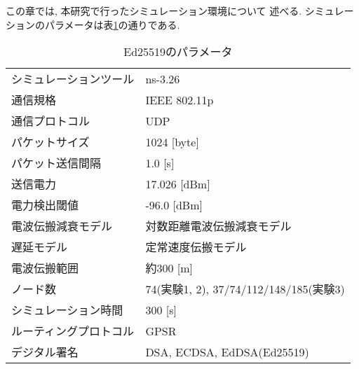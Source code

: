 この章では, 本研究で行ったシミュレーション環境について
述べる. シミュレーションのパラメータは表\ref{tab:simulation_parameter}の通りである.
\setlength{\tabcolsep}{30pt}
\begin{longtable}{ll}
  \label{tab:simulation_parameter} \\
  \caption{Ed25519のパラメータ}
  \endfirsthead
  \hline
  シミュレーションツール & ns-3.26 \\
  通信規格 & IEEE 802.11p \\
  通信プロトコル & UDP \\
  パケットサイズ & 1024 [byte] \\
  パケット送信間隔 & 1.0 [s] \\
  送信電力 & 17.026 [dBm] \\
  電力検出閾値 & -96.0 [dBm] \\
  電波伝搬減衰モデル & 対数距離電波伝搬減衰モデル \\
  遅延モデル & 定常速度伝搬モデル \\
  電波伝搬範囲 & 約300 [m] \\
  ノード数 & 74(実験1, 2), 37/74/112/148/185(実験3) \\
  シミュレーション時間 & 300 [s] \\
  ルーティングプロトコル & GPSR \\
  デジタル署名 & DSA, ECDSA, EdDSA(Ed25519) \\ \hline
\end{longtable}
\vspace{3em}


\vspace{2em}

\vspace{2em}

\vspace{1em}

\vspace{2em}

\vspace{2em}

